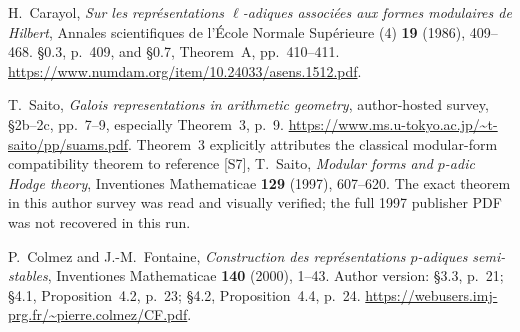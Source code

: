 H.~Carayol, \emph{Sur les repr\'esentations $\ell$-adiques associ\'ees
aux formes modulaires de Hilbert}, Annales scientifiques de l'\'Ecole
Normale Sup\'erieure (4) \textbf{19} (1986), 409--468.
\S0.3, p.~409, and \S0.7, Theorem~A, pp.~410--411.
\url{https://www.numdam.org/item/10.24033/asens.1512.pdf}.

T.~Saito, \emph{Galois representations in arithmetic geometry},
author-hosted survey, \S2b--2c, pp.~7--9,
especially Theorem~3, p.~9.
\url{https://www.ms.u-tokyo.ac.jp/~t-saito/pp/suams.pdf}.
Theorem~3 explicitly attributes the classical modular-form compatibility
theorem to reference [S7], T.~Saito,
\emph{Modular forms and $p$-adic Hodge theory},
Inventiones Mathematicae \textbf{129} (1997), 607--620.
The exact theorem in this author survey was read and visually verified;
the full 1997 publisher PDF was not recovered in this run.

P.~Colmez and J.-M.~Fontaine,
\emph{Construction des repr\'esentations $p$-adiques semi-stables},
Inventiones Mathematicae \textbf{140} (2000), 1--43.
Author version: \S3.3, p.~21; \S4.1, Proposition~4.2, p.~23;
\S4.2, Proposition~4.4, p.~24.
\url{https://webusers.imj-prg.fr/~pierre.colmez/CF.pdf}.
